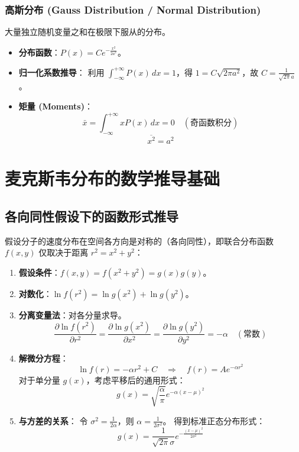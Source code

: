 \documentclass{article}
\begin{document}
\subsubsection{高斯分布 (Gauss Distribution / Normal Distribution)}
大量独立随机变量之和在极限下服从的分布。
\begin{itemize}
    \item \textbf{分布函数}：$P(x) = C e^{-\frac{x^2}{2a^2}}$。
    \item \textbf{归一化系数推导}：
    利用 $\int_{-\infty}^{+\infty} P(x) \, dx = 1$，得 $1 = C \sqrt{2\pi a^2}$，故 $C = \frac{1}{\sqrt{2\pi} a}$。
    \item \textbf{矩量 (Moments)}：
    \[ \bar{x} = \int_{-\infty}^{+\infty} x P(x) \, dx = 0 \quad (\text{奇函数积分}) \]
    \[ \overline{x^2} = a^2 \]
\end{itemize}

\section{麦克斯韦分布的数学推导基础}

\subsection{各向同性假设下的函数形式推导}
假设分子的速度分布在空间各方向是对称的（各向同性），即联合分布函数 $f(x, y)$ 仅取决于距离 $r^2 = x^2 + y^2$：
\begin{enumerate}
    \item \textbf{假设条件}：$f(x, y) = f(x^2 + y^2) = g(x)g(y)$。
    \item \textbf{对数化}：$\ln f(r^2) = \ln g(x^2) + \ln g(y^2)$。
    \item \textbf{分离变量法}：对各分量求导。
    \[ \frac{\partial \ln f(r^2)}{\partial r^2} = \frac{\partial \ln g(x^2)}{\partial x^2} = \frac{\partial \ln g(y^2)}{\partial y^2} = -\alpha \quad (\text{常数}) \]
    \item \textbf{解微分方程}：
    \[ \ln f(r) = -\alpha r^2 + C \quad \Rightarrow \quad f(r) = A e^{-\alpha r^2} \]
    对于单分量 $g(x)$，考虑平移后的通用形式：
    \[ g(x) = \sqrt{\frac{\alpha}{\pi}} e^{-\alpha(x-\mu)^2} \]
    \item \textbf{与方差的关系}：
    令 $\sigma^2 = \frac{1}{2\alpha}$，则 $\alpha = \frac{1}{2\sigma^2}$。
    得到标准正态分布形式：
    \[ g(x) = \frac{1}{\sqrt{2\pi}\sigma} e^{-\frac{(x-\mu)^2}{2\sigma^2}} \]
\end{enumerate}
\end{document}
